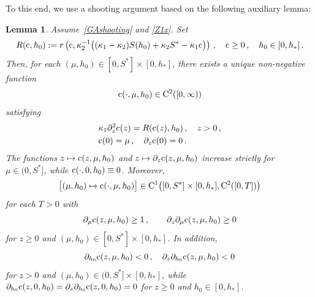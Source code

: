 \documentclass[reqno,11pt]{amsart}
\newtheorem{lem}[thm]{Lemma}
\numberwithin{equation}{section}
\begin{document}
To this end, we use a shooting argument based on the following auxiliary lemma:


\begin{lem}\label{L17} 
 Assume~\eqref{GAshooting} and \eqref{Z1x}.
Set
$$
R({\rm c},h_0):=r\left({\rm c},\kappa_2^{-1}\big((\kappa_1-\kappa_2)S(h_0)+\kappa_2 S^*-\kappa_1 {\rm c}\big)\right)\,,\quad {\rm c}\ge 0\,,\quad h_0\in [0,h_*]\,.
$$
Then, for each $(\mu,h_0)\in [0,S^*]\times [0,h_*]$, there exists a unique non-negative function $${\rm c}(\cdot,\mu,h_0)\in {\rm C}^2([0,\infty))$$ satisfying
\begin{subequations}\label{shooting}
\begin{align}
&\kappa_1\partial_z^2 {\rm c}(z)=R({\rm c}(z),h_0)\,, \quad z>0\,, \label{A1ss}\\
&{\rm c}(0)=\mu\,,\quad \partial_z {\rm c}(0)=0\,. \label{A4ss}
\end{align}
\end{subequations}
The functions $z\mapsto {\rm c}(z,\mu,h_0)$ and $z\mapsto \partial_z{\rm c}(z,\mu,h_0)$ increase strictly for $\mu\in (0,S^*]$, while ${\rm c}(\cdot,0,h_0)\equiv 0$. Moreover,
$$
\big[(\mu,h_0)\mapsto {\rm c}(\cdot,\mu,h_0)\big]\in {\rm C}^1\big( [0,S^*]\times [0,h_*],{\rm C}^2([0,T])\big)
$$
for each $T>0$ 
with 
\begin{equation}\label{ww}
\partial_\mu {\rm c}(z,\mu,h_0)\ge 1\,,\qquad \partial_z\partial_\mu {\rm c}(z,\mu,h_0)\ge 0
\end{equation} 
for $z\ge 0$ and  $(\mu,h_0)\in [0,S^*]\times [0,h_*]$. In addition, 
$$
\partial_{h_0} {\rm c}(z,\mu,h_0)<0\,,\quad \partial_z\partial_{h_0} {\rm c}(z,\mu,h_0)<0
$$
for $ z> 0$ and $(\mu,h_0)\in (0,S^*]\times [0,h_*]$, while $\partial_{h_0}{\rm c}(z,0,h_0)=\partial_z\partial_{h_0}{\rm c}(z,0,h_0)=0$ for $z\ge 0$ and $h_0\in [0,h_*]$.
\end{lem}
\end{document}
